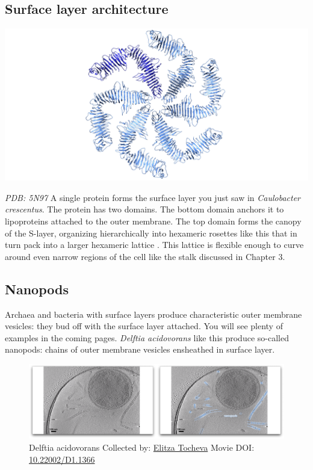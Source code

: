 \documentclass[]{tufte-book}
\begin{document}
\subsection{Surface layer
architecture}\label{Surface_layer_architecture}

\includegraphics{img/schematics/2_6_1}

\emph{PDB: 5N97} A single protein forms the surface layer you just saw
in \emph{Caulobacter crescentus}. The protein has two domains. The
bottom domain anchors it to lipoproteins attached to the outer membrane.
The top domain forms the canopy of the S-layer, organizing
hierarchically into hexameric rosettes like this that in turn pack into
a larger hexameric lattice \citep{bharat2017}. This lattice is flexible
enough to curve around even narrow regions of the cell like the stalk
discussed in Chapter 3.

\hypertarget{Nanopods}{\subsection{Nanopods}\label{Nanopods}}

Archaea and bacteria with surface layers produce characteristic outer
membrane vesicles: they bud off with the surface layer attached. You
will see plenty of examples in the coming pages. \emph{Delftia
acidovorans} like this produce so-called nanopods: chains of outer
membrane vesicles ensheathed in surface layer.





\begin{figure}
\includegraphics{movie_stills/2_6a} \caption[Delftia acidovorans Collected by:
\protect\hyperlink{elitza_tocheva}{Elitza Tocheva} Movie DOI:
\href{https://doi.org/10.22002/D1.1366}{10.22002/D1.1366}]{Delftia acidovorans Collected by:
\protect\hyperlink{elitza_tocheva}{Elitza Tocheva} Movie DOI:
\href{https://doi.org/10.22002/D1.1366}{10.22002/D1.1366}}\label{fig:2-6a}
\end{figure}
\end{document}
